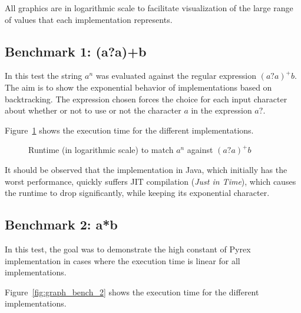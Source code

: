 \documentclass{llncs}
\begin{document}
All graphics are in logarithmic scale to facilitate visualization of the large range of values that each implementation represents. 

\subsection{Benchmark 1: (a?a)+b}

In this test the string $a^n$ was evaluated against the regular expression $(a?a)^+b$. The aim is to show the exponential behavior of implementations based on backtracking. The expression chosen forces the choice for each input character about whether or not to use or not the character $a$ in the expression $a?$. 

Figure~\ref {fig:graph_bench_1} shows the execution time for the different implementations. 

\begin{figure}[!htbp]
\centering
{}
\caption{Runtime (in logarithmic scale) to match $a^n$ against $(a?a)^+b$}
\label{fig:graph_bench_1}
\end{figure}

It should be observed that the implementation in Java, which initially has the worst performance, quickly suffers JIT compilation (\emph{Just in Time}), which causes the runtime to drop significantly, while keeping its exponential character. 

\subsection{Benchmark 2: a*b}

In this test, the goal was to demonstrate the high constant of Pyrex implementation in cases where the execution time is linear for all implementations.

Figure~\ref {fig:graph_bench_2} shows the execution time for the different implementations.
\end{document}
